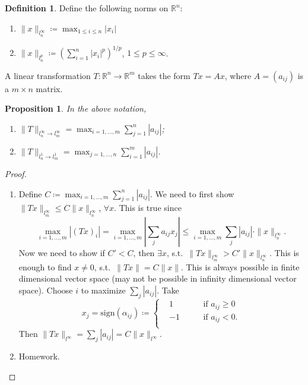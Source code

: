 \documentclass[12pt]{article}
\theoremstyle{plain}
\newtheorem*{prop}{Proposition}
\theoremstyle{definition}
\newtheorem*{defn}{Definition}
\begin{document}
\begin{defn}
    Define the following norms on $\mathbb{R}^n$:
    \begin{enumerate}
        \item $\|x\|_{l_n^\infty} \coloneqq \max_{1\leq i\leq n}|x_i|$
        \item $\|x\|_{l_n^p} \coloneqq \left(\sum_{i=1}^n |x_i|^p\right)^{1/p}$, $1\leq p\leq \infty$.
    \end{enumerate}
    A linear transformation $T:\mathbb{R}^n\rightarrow \mathbb{R}^m$ takes the form $Tx=Ax$, where $A=(a_{ij})$ is a
    $m\times n$ matrix.
\end{defn}

\begin{prop}
    In the above notation,
    \begin{enumerate}
        \item $\|T\|_{l_n^\infty\rightarrow l_m^\infty} = \max_{i=1,\ldots,m} \sum_{j=1}^n |a_{ij}|$;
        \item $\|T\|_{l_n^1\rightarrow l_m^1} = \max_{j=1,\ldots,n} \sum_{i=1}^m |a_{ij}|$.
    \end{enumerate}
\end{prop}
\begin{proof}
    \begin{enumerate}
        \item Define $C\coloneqq\max_{i=1,\ldots,m} \sum_{j=1}^n |a_{ij}|$.
            We need to first show $\|Tx\|_{l_m^\infty} \leq C\|x\|_{l_n^\infty}$, $\forall x$.
            This is true since
            \[
                \max_{i=1,\ldots,m} \left|(Tx)_i\right| = \max_{i=1,\ldots, m} \left|\sum_{j}a_{ij}x_j\right|
                \leq \max_{i=1,\ldots, m}\sum_j |a_{ij}|\cdot \|x\|_{l_n^\infty}.
            \]
            Now we need to show if $C'<C$, then $\exists x$, s.t.\ $\|Tx\|_{l_m^\infty} > C'\|x\|_{l_n^\infty}$.
            This is enough to find $x\neq 0$, s.t.\ $\|Tx\| = C\|x\|$.
            This is always possible in finite dimensional vector space (may not be possible in infinity dimensional
            vector space).
            Choose $i$ to maximize $\sum_j |a_{ij}|$.
            Take 
            \[
                x_j = \text{sign}(\alpha_{ij})\coloneqq 
                \left\{
                    \begin{aligned}
                        &1\qquad&&\text{if }a_{ij}\geq 0\\
                        &-1&&\text{if }a_{ij}<0.\\
                    \end{aligned}
                \right.
            \]
            Then $\|Tx\|_{l^\infty} = \sum_j |a_{ij}| = C\|x\|_{l^\infty}$.
        \item Homework.
    \end{enumerate}
\end{proof}
\end{document}
